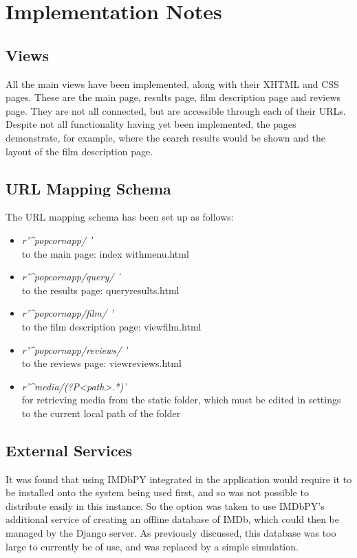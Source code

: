 \documentclass{sig-alt-release2}
\begin{document}
\section{Implementation Notes}

\subsection*{Views}
All the main views have been implemented, along with their XHTML and CSS pages. These are the main page, results page, film description page and reviews page. They are not all connected, but are accessible through each of their URLs. Despite not all functionality having yet been implemented, the pages demonstrate, for example, where the search results would be shown and the layout of the film description page.

\subsection*{URL Mapping Schema}
The URL mapping schema has been set up as follows:
\begin{itemize}
\item {\it r'\textasciicircum popcorn\textunderscore app/ \textdollar ' } \\
to the main page: index \textunderscore with\textunderscore menu.html
\item {\it r'\textasciicircum popcorn\textunderscore app/query/ \textdollar '} \\
to the results page: query\textunderscore results.html
\item {\it r'\textasciicircum popcorn\textunderscore app/film/ \textdollar '} \\
to the film description page: view\textunderscore film.html
\item {\it r'\textasciicircum popcorn\textunderscore app/reviews/ \textdollar '} \\
to the reviews page: view\textunderscore reviews.html
\item {\it r'\textasciicircum media/(?P<path>.*)\textdollar '} \\
for retrieving media from the static folder, which must be edited in settings to the current local path of the folder
\end{itemize}

\subsection*{External Services}
It was found that using IMDbPY integrated in the application would require it to be installed onto the system being used first, and so was not possible to distribute easily in this instance. So the option was taken to use IMDbPY's additional service of creating an offline database of IMDb, which could then be managed by the Django server. As previously discussed, this database was too large to currently be of use, and was replaced by a simple simulation.
\end{document}
